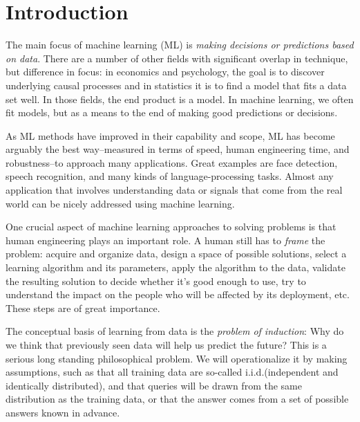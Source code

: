 \chapter{Introduction}
\label{chap-intro}

The main focus of {machine learning} (ML) is {\em making decisions or
    predictions based on data}.  There are a number of other fields with
significant overlap in technique, but difference in focus: 
in economics and psychology, the goal is to discover underlying causal
processes and in statistics it is to find a model that fits a data set
well.  In those fields, the end product is a model.  In machine
learning, we often fit models, but as a means to the end of making
good predictions or decisions.

As ML methods have improved in their capability and
scope, ML has become arguably the best way--measured in terms of speed, human
engineering time, and robustness--to approach many applications.  Great
examples are face detection, speech recognition, and many kinds of
language-processing tasks.   Almost any application that involves
understanding data or signals that come from the real world can be
nicely addressed using machine learning.

One crucial  aspect of machine
learning approaches to solving problems is that human engineering
plays an important role.  A human still has to {\em frame} the
problem:  acquire and organize data, design a space of possible
solutions, select a learning algorithm and its parameters, apply the
algorithm to the data, validate the resulting solution to decide
whether it's good enough to use, try to understand the impact on the
people who will be affected by its deployment, etc.   These steps are of great
importance.


The conceptual basis of learning from data is the {\em problem of
    induction}: %
Why do we think that
previously seen data will help us predict the future?  This is a
serious long standing philosophical problem.  We will
operationalize it by making assumptions, such as that all training
data are so-called i.i.d.(independent and identically distributed),
 and that
queries will be drawn from the same distribution as the training data,
or that the answer comes from a set of possible answers known in
advance.

